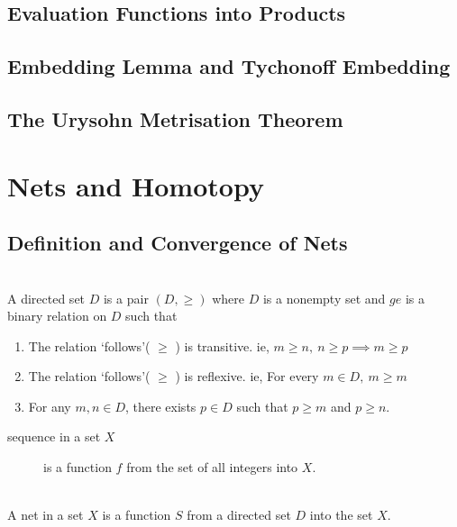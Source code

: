 \subsection{Evaluation Functions into Products}
\subsection{Embedding Lemma and Tychonoff Embedding}
\subsection{The Urysohn Metrisation Theorem}
\pagebreak
\section{Nets and Homotopy}
\subsection{Definition and Convergence of Nets}
\begin{definition}\cite[10.1.1]{joshi}\\
	A directed set \(D\) is a pair \( (D,\ge) \) where \( D \) is a nonempty set and  \( ge \) is a binary relation on \( D \) such that
	\begin{enumerate}%
		\item The relation `follows'( \( \ge \) ) is transitive.
			ie,  \( m \ge n,\ n \ge p \implies m \ge p \)
		\item The relation `follows'( \( \ge \) ) is reflexive.
			ie, For every \( m \in D,\ m \ge m \)
		\item For any \( m,n \in D \), there exists \( p \in D \) such that \( p \ge m \) and \( p \ge n \).
	\end{enumerate}
\end{definition}

\begin{description}
	\item[sequence in a set \( X \)] is a function \( f \) from the set of all integers into \( X \).
\end{description}

\begin{definition}[Net]\cite[10.1.2]{joshi}\\
	A net in a set \( X \) is a function \( S \) from a directed set \( D \) into the set \( X \).
\end{definition}

